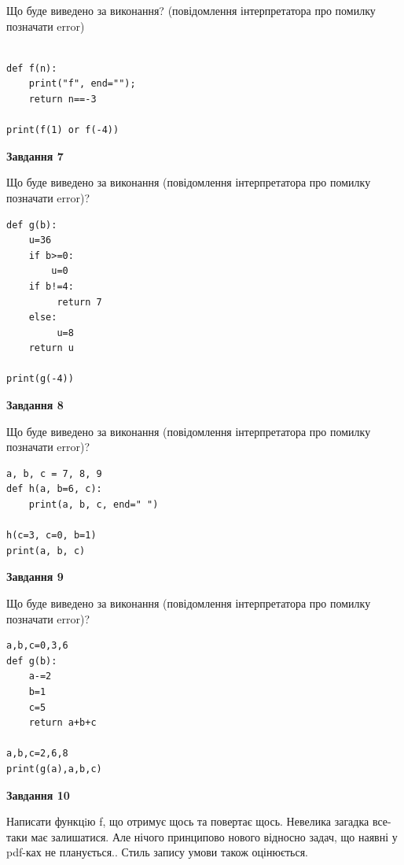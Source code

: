 \documentclass[12pt, ukrainian]{article}
\begin{document}
{\begin {large}
Що буде виведено за виконання? (повідомлення інтерпретатора про помилку позначати error)\par
\begin{verbatim}

def f(n):
    print("f", end="");
    return n==-3

print(f(1) or f(-4))
\end{verbatim}

{\begin {center}\textbf{Завдання 7}\end {center}}

Що буде виведено за виконання (повідомлення інтерпретатора про помилку позначати error)?\par
\begin{verbatim}
def g(b):
    u=36
    if b>=0: 
        u=0
    if b!=4:
         return 7
    else:
         u=8
    return u

print(g(-4))
\end{verbatim}

{\begin {center}\textbf{Завдання 8}\end {center}}

Що буде виведено за виконання (повідомлення інтерпретатора про помилку позначати error)?\par
\begin{verbatim}
a, b, c = 7, 8, 9
def h(a, b=6, c):
    print(a, b, c, end=" ")

h(c=3, c=0, b=1)
print(a, b, c)
\end{verbatim}

{\begin {center}\textbf{Завдання 9}\end {center}}

Що буде виведено за виконання (повідомлення інтерпретатора про помилку позначати error)?\par
\begin{verbatim}
a,b,c=0,3,6
def g(b):
    a-=2
    b=1
    c=5
    return a+b+c

a,b,c=2,6,8
print(g(a),a,b,c)
\end{verbatim}

{\begin {center}\textbf{Завдання 10}\end {center}}


Написати функцiю f, що отримує щось та повертає щось. Невелика загадка все-таки має залишатися. Але нічого принципово нового відносно задач, що наявні у pdf-ках не планується.. Стиль запису умови також оцінюється.\par
\end {large}}
\newpage
\end{document}
